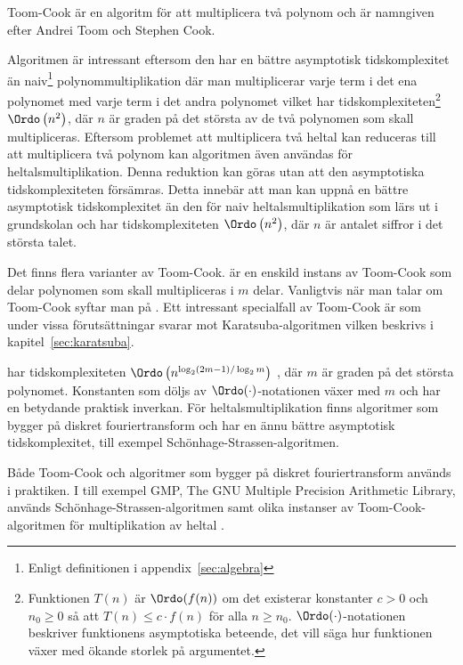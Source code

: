 Toom-Cook är en algoritm för att multiplicera två polynom och är namngiven efter
Andrei Toom och Stephen Cook.

Algoritmen är intressant eftersom den har en bättre asymptotisk tidskomplexitet
än naiv\footnote{Enligt definitionen i appendix~\ref{sec:algebra}}
polynommultiplikation där man multiplicerar varje term i det ena polynomet med
varje term i det andra polynomet vilket har
tidskomplexiteten\footnote{Funktionen $T(n)$ är $\Ordo(f(n))$ om det existerar
konstanter $c > 0$ och $n_0 \geq 0$ så att $T(n) \leq c \cdot f(n)$ för alla $n
\geq n_0$. $\Ordo(\cdot )$-notationen beskriver funktionens asymptotiska
beteende, det vill säga hur funktionen växer med ökande storlek på argumentet.}
$\Ordo\left(n^2\right)$, där $n$ är graden på det största av de två polynomen
som skall multipliceras. Eftersom problemet att multiplicera två heltal kan
reduceras till att multiplicera två polynom kan algoritmen även användas för
heltalsmultiplikation. Denna reduktion kan göras utan att den asymptotiska
tidskomplexiteten försämras. Detta innebär att man kan uppnå en bättre
asymptotisk tidskomplexitet än den för naiv heltalsmultiplikation som lärs ut i
grundskolan och har tidskomplexiteten $\Ordo\left(n^2\right)$, där $n$ är
antalet siffror i det största talet.

Det finns flera varianter av Toom-Cook.  är en enskild instans av
Toom-Cook som delar polynomen som skall multipliceras i $m$ delar. Vanligtvis
när man talar om Toom-Cook syftar man på . Ett intressant specialfall
av Toom-Cook är  som under vissa förutsättningar svarar mot
Karatsuba-algoritmen vilken beskrivs i kapitel~\ref{sec:karatsuba}.

 har tidskomplexiteten $\Ordo \left(n^{\log_2(2 m-1)/\log_2 m}\right)$
\cite{bodrato2007towards}, där $m$ är graden på det största polynomet.
Konstanten som döljs av $\Ordo(\cdot)$-notationen växer med $m$ och har en
betydande praktisk inverkan. För heltalsmultiplikation finns algoritmer som
bygger på diskret fouriertransform och har en ännu bättre asymptotisk
tidskomplexitet, till exempel Schönhage-Strassen-algoritmen.

Både Toom-Cook och algoritmer som bygger på diskret fouriertransform används i
praktiken. I till exempel GMP, The GNU Multiple Precision Arithmetic Library,
används Schönhage-Strassen-algoritmen samt olika instanser av
Toom-Cook-algoritmen för multiplikation av heltal \cite{gmpdoc}.
